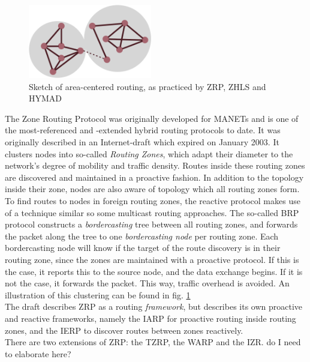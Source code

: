 \documentclass[a4paper,10pt]{scrartcl}
\begin{document}
\begin{figure}
  \begin{center}
    \includegraphics[width=0.48\textwidth]{../images/ZRP}
  \end{center}
  \caption{Sketch of area-centered routing, as practiced by ZRP, ZHLS and HYMAD}
  \label{fig:area_centered}
\end{figure}

The Zone Routing Protocol was originally developed for \glspl{MANET} and is one of the most-referenced and -extended hybrid routing protocols to date. It was originally described in an Internet-draft which expired on January 2003\cite{ZRP-Draft}.
It clusters nodes into so-called \emph{Routing Zones}, which adapt their diameter to the network's degree of mobility and traffic density. Routes inside these routing zones are discovered and maintained in a proactive fashion. In addition to the topology inside their zone, nodes are also aware of topology which all routing zones form.
To find routes to nodes in foreign routing zones, the reactive protocol makes use of a technique similar so some multicast routing approaches. The so-called \gls{BRP}\cite{draft-ietf-manet-zone-brp} protocol constructs a \emph{bordercasting} tree between all routing zones, and forwards the packet along the tree to one \emph{bordercasting node} per routing zone. Each bordercasting node will know if the target of the route discovery is in their routing zone, since the zones are maintained with a proactive protocol. If this is the case, it reports this to the source node, and the data exchange begins. If it is not the case, it forwards the packet. This way, traffic overhead is avoided. An illustration of this clustering can be found in fig. \ref{fig:area_centered}\\
The draft describes ZRP as a routing \emph{framework}, but describes its own proactive and reactive frameworks, namely the \gls{IARP}\cite{draft-ietf-manet-zone-iarp} for proactive routing inside routing zones, and the \gls{IERP}\cite{draft-ietf-manet-zone-ierp} to discover routes between zones reactively.\\
There are two extensions of ZRP: the \gls{TZRP}\cite{TZRP}, the \gls{WARP}\cite{WARP}  and the \gls{IZR}\cite{IZR}. \todo
{do I need to elaborate here?}
\end{document}
